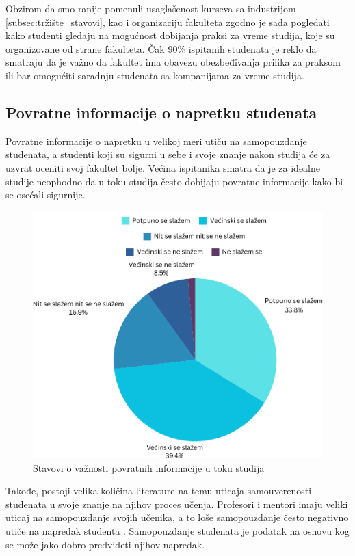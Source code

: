 \documentclass[a4paper]{article}
\begin{document}
{Obzirom da smo ranije pomenuli usaglašenost kurseva sa industrijom \ref{subsec:tržište_stavovi}, kao i organizaciju fakulteta  zgodno je sada pogledati kako studenti gledaju na mogućnost dobijanja praksi za vreme studija, koje su organizovane od strane fakulteta. Čak 90\% ispitanih studenata je reklo da smatraju da je važno da fakultet ima obavezu obezbeđivanja prilika za praksom ili bar omogućiti saradnju studenata sa kompanijama za vreme studija.

\subsection{Povratne informacije o napretku studenata}
\label{subsec:povrane_informacije}

Povratne informacije o napretku u velikoj meri utiču na samopouzdanje studenata, a studenti koji su sigurni u sebe i svoje znanje nakon studija će za uzvrat oceniti svoj fakultet bolje. Većina ispitanika smatra da je za idealne studije neophodno da u toku studija često dobijaju povratne informacije kako bi se osećali sigurnije. 
\begin{figure}[h!]
\begin{center}
    \includegraphics[scale = 0.3]{PieChartPovratneInformacije.png}
    \caption{Stavovi o važnosti povratnih informacije u toku studija}
    \label{fig:povratne_informacije}
\end{center}
\end{figure}

Takođe, postoji velika količina literature na temu uticaja samouverenosti studenata u svoje znanje na njihov proces učenja. Profesori i mentori imaju veliki uticaj na samopouzdanje svojih učenika, a to loše samopouzdanje često negativno utiče na napredak studenta \cite{G1}. 
Samopouzdanje studenata je podatak na osnovu kog se može jako dobro predvideti njihov napredak.\cite{G2}


}
\end{document}
